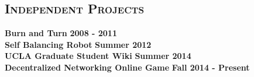 \documentclass[margin, 10pt]{res} %
\begin{document}
\begin{resume}
 
\section{\textsc{Independent Projects}}

\textbf{Burn and Turn} \hfill \textbf{2008 - 2011}\\

\textbf{Self Balancing Robot} \hfill \textbf{Summer 2012}\\

\textbf{UCLA Graduate Student Wiki} \hfill \textbf{Summer 2014}\\

\textbf{Decentralized Networking Online Game} \hfill \textbf{Fall 2014 - Present}\\


\end{resume}
\end{document}
